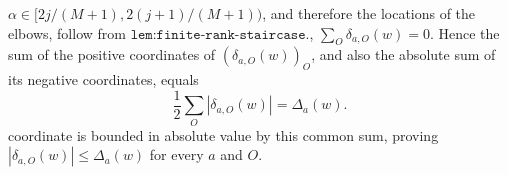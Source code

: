 \(\alpha\in[2j/(M+1),2(j+1)/(M+1))\), and therefore the locations of the elbows, follow from \(\texttt{lem:finite-rank-staircase}\).\n\nFinally, \(\sum_O\delta_{a,O}(w)=0\). Hence the sum of the positive coordinates of \((\delta_{a,O}(w))_O\), and also the absolute sum of its negative coordinates, equals\n\[\frac12\sum_O|\delta_{a,O}(w)|=\Delta_a(w).\]\nEvery coordinate is bounded in absolute value by this common sum, proving \(|\delta_{a,O}(w)|\le\Delta_a(w)\) for every \(a\) and \(O\).